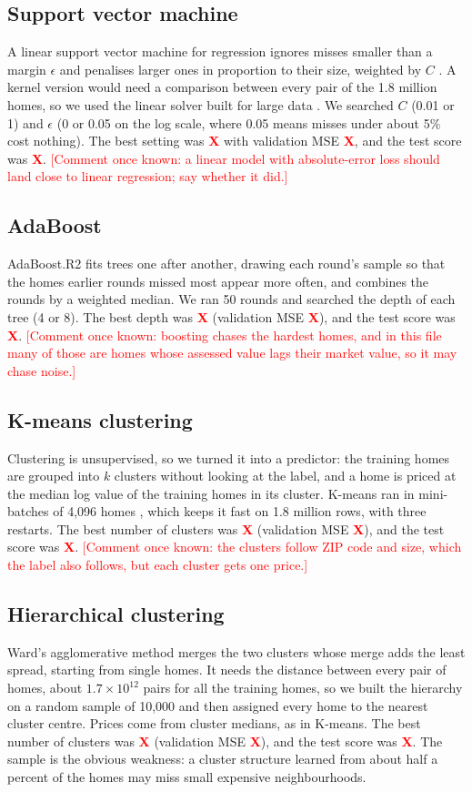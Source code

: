 \documentclass[sigconf,nonacm,10pt]{acmart}
\newcommand{\X}{\textcolor{red}{\textbf{X}}}
\newcommand{\pending}[1]{\textcolor{red}{[#1]}}
\begin{document}
\subsection{Support vector machine}
A linear support vector machine for regression ignores misses smaller than a margin $\epsilon$ and penalises larger ones in proportion to their size, weighted by $C$ \cite{cortes1995}. A kernel version would need a comparison between every pair of the 1.8 million homes, so we used the linear solver built for large data \cite{ho2012}. We searched $C$ (0.01 or 1) and $\epsilon$ (0 or 0.05 on the log scale, where 0.05 means misses under about 5\% cost nothing). The best setting was \X{} with validation MSE \X, and the test score was \X. \pending{Comment once known: a linear model with absolute-error loss should land close to linear regression; say whether it did.}

\subsection{AdaBoost}
AdaBoost.R2 \cite{freund1997,drucker1997} fits trees one after another, drawing each round's sample so that the homes earlier rounds missed most appear more often, and combines the rounds by a weighted median. We ran 50 rounds and searched the depth of each tree (4 or 8). The best depth was \X{} (validation MSE \X), and the test score was \X. \pending{Comment once known: boosting chases the hardest homes, and in this file many of those are homes whose assessed value lags their market value, so it may chase noise.}

\subsection{K-means clustering}
Clustering is unsupervised, so we turned it into a predictor: the training homes are grouped into $k$ clusters without looking at the label, and a home is priced at the median log value of the training homes in its cluster. K-means \cite{lloyd1982} ran in mini-batches of 4,096 homes \cite{sculley2010}, which keeps it fast on 1.8 million rows, with three restarts. The best number of clusters was \X{} (validation MSE \X), and the test score was \X. \pending{Comment once known: the clusters follow ZIP code and size, which the label also follows, but each cluster gets one price.}

\subsection{Hierarchical clustering}
Ward's agglomerative method \cite{ward1963} merges the two clusters whose merge adds the least spread, starting from single homes. It needs the distance between every pair of homes, about $1.7 \times 10^{12}$ pairs for all the training homes, so we built the hierarchy on a random sample of 10,000 and then assigned every home to the nearest cluster centre. Prices come from cluster medians, as in K-means. The best number of clusters was \X{} (validation MSE \X), and the test score was \X. The sample is the obvious weakness: a cluster structure learned from about half a percent of the homes may miss small expensive neighbourhoods.
\end{document}
